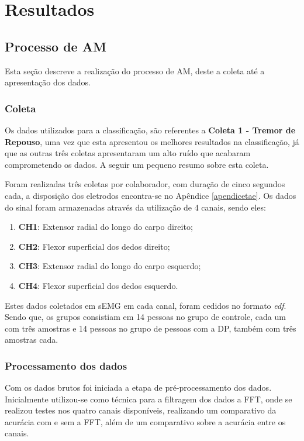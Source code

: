 \chapter{Resultados}
\label{ch:Resultados}

\section{Processo de AM}
Esta seção descreve a realização do processo de AM, deste a coleta até a apresentação dos dados.
\subsection{Coleta}
Os dados utilizados para a classificação, são referentes a \textbf{Coleta 1 - Tremor de Repouso}, uma vez que esta apresentou os melhores resultados na classificação, já que as outras três coletas apresentaram um alto ruído que acabaram comprometendo os dados. A seguir um pequeno resumo sobre esta coleta.

Foram realizadas três coletas por colaborador, com duração de cinco segundos cada, a disposição dos eletrodos encontra-se no Apêndice \ref{apendicetae}. Os dados do sinal foram armazenadas através da utilização de 4 canais, sendo eles:

\begin{enumerate}
    \item \textbf{CH1}: Extensor radial do longo do carpo direito;
    \item \textbf{CH2}: Flexor superficial dos dedos direito;
    \item \textbf{CH3}: Extensor radial do longo do carpo esquerdo;
    \item \textbf{CH4}: Flexor superficial dos dedos esquerdo.
\end{enumerate}

Estes dados coletados em sEMG em cada canal, foram cedidos no formato \textit{edf}. Sendo que, os grupos consistiam em 14 pessoas no grupo de controle, cada um com três amostras e 14 pessoas no grupo de pessoas com a DP, também com três amostras cada.

\subsection{Processamento dos dados}
Com os dados brutos foi iniciada a etapa de pré-processamento dos dados. Inicialmente utilizou-se como técnica para a filtragem dos dados a FFT, onde se realizou testes nos quatro canais disponíveis, realizando um comparativo da acurácia com e sem a FFT, além de um comparativo sobre a acurácia entre os canais.

